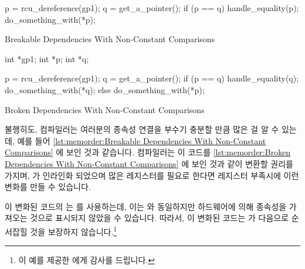 {{\begin{listing}[tbp]
\begin{fcvlabel}
\begin{VerbatimL}
p = rcu_dereference(gp1);
q = get_a_pointer();
if (p == q)
	handle_equality(p);
do_something_with(*p);
\end{VerbatimL}
\end{fcvlabel}
\caption{Breakable Dependencies With Non-Constant Comparisons}
\label{lst:memorder:Breakable Dependencies With Non-Constant Comparisons}
\end{listing}%
%
\begin{listing}[tbp]
\begin{fcvlabel}
\begin{VerbatimL}[commandchars=\\\[\]]
int *gp1;
int *p;
int *q;

p = rcu_dereference(gp1);		\lnlbl[p]
q = get_a_pointer();
if (p == q) {
	handle_equality(q);
	do_something_with(*q);		\lnlbl[q]
} else {
	do_something_with(*p);
}
\end{VerbatimL}
\end{fcvlabel}
\caption{Broken Dependencies With Non-Constant Comparisons}
\label{lst:memorder:Broken Dependencies With Non-Constant Comparisons}
\end{listing}%
%

	불행히도, 컴파일러는 여러분의 종속성 연결을 부수기 충분할 만큼 많은 걸
	알 수 있는데, 예를 들어
	\cref{lst:memorder:Breakable Dependencies With Non-Constant Comparisons}
	에 보인 것과 같습니다.
	컴파일러는 이 코드를
	\cref{lst:memorder:Broken Dependencies With Non-Constant Comparisons}
	에 보인 것과 같이 변환할 권리를 가지며,  가
	인라인화 되었으며 많은 레지스터를 필요로 한다면 레지스터 부족시에 이런
	변화를 만들 수 있습니다.
	\begin{fcvref}
	이 변화된 코드의  는  를 사용하는데, 이는  와
	동일하지만 하드웨어에 의해 종속성을 가져오는 것으로 표시되지 않았을 수
	있습니다.
	따라서, 이 변화된 코드는  가  다음으로 순서잡힐
	것을 보장하지 않습니다.\footnote{
		이 예를 제공한  에게 감사를 드립니다.}
	\end{fcvref}

	\iffalse

}}
